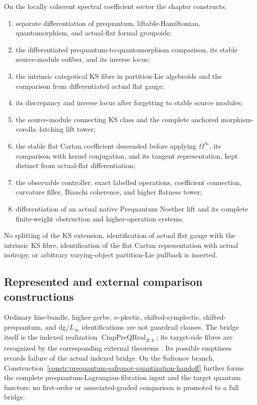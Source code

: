 On the locally coherent spectral coefficient sector the chapter constructs:
\begin{enumerate}
\item separate differentiation of prequantum, liftable-Hamiltonian,
      quantomorphism, and actual-flat formal groupoids;
\item the differentiated prequantum-to-quantomorphism comparison, its stable
      source-module cofiber, and its inverse locus;
\item the intrinsic categorical KS fibre in partition-Lie algebroids and the
      comparison from differentiated actual flat gauge;
\item its discrepancy and inverse locus after forgetting to stable source modules;
\item the source-module connecting KS class and the complete anchored
      morphism-corolla--latching lift tower;
\item the stable flat Cartan coefficient descended before applying
      $\Omega^\infty$, its comparison with kernel conjugation, and its tangent
      representation, kept distinct from actual-flat differentiation;
\item the observable controller, exact labelled operations, coefficient
      connection, curvature filler, Bianchi coherence, and higher flatness tower;
\item differentiation of an actual native Prequantum Noether lift and its complete
      finite-weight obstruction and higher-operation systems.
\end{enumerate}
No splitting of the KS extension, identification of actual flat gauge with the
intrinsic KS fibre, identification of the flat Cartan representation with actual
isotropy, or arbitrary varying-object partition-Lie pullback is inserted.

\subsection{Represented and external comparison constructions}
\label{subsec:prequantum-audit-comparison}

Ordinary line-bundle, higher-gerbe, $n$-plectic, shifted-symplectic,
shifted-prequantum, and dg/$L_\infty$ identifications are not guardrail clauses.
The bridge itself is the indexed realization
$\operatorname{CmpPreQReal}_{\mathcal B,b}$; its target-side
fibres are recognized by the corresponding external theorems
\cite{Kostant1970,Rogers2012,FiorenzaRogersSchreiber2013,
PantevToenVaquieVezzosi2013,Calaque2015,Safronov2020}.  Its possible emptiness
records failure of the actual indexed bridge.  On the Safronov branch,
Construction~\ref{constr:prequantum-safronov-quantization-handoff} further forms
the complete prequantum-Lagrangian-fibration input and the target quantum
functors; no first-order or associated-graded comparison is promoted to a full
bridge.

